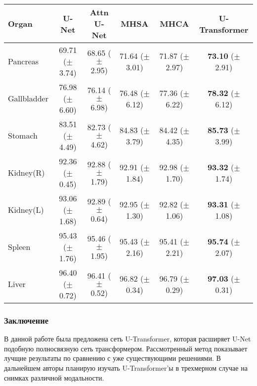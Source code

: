 {\small 
\begin{center}
    \begin{tabular}{l|cc|ccc}
        \toprule[1pt]
        Organ & U-Net& Attn U-Net & MHSA & MHCA & U-Transformer \\
        \hline
        Pancreas & 69.71 \footnotesize{($\pm$ 3.74)} & 68.65 \footnotesize{($\pm$ 2.95)} & 71.64 \footnotesize{($\pm$ 3.01)} & 71.87 \footnotesize{($\pm$ 2.97)} & \textbf{73.10} \footnotesize{($\pm$ 2.91)} \\
        Gallbladder & 76.98 \footnotesize{($\pm$ 6.60)} & 76.14 \footnotesize{($\pm$ 6.98)} & 76.48 \footnotesize{($\pm$ 6.12)} & 77.36 \footnotesize{($\pm$ 6.22)} & \textbf{78.32} \footnotesize{($\pm$ 6.12)} \\
        Stomach & 83.51 \footnotesize{($\pm$ 4.49)} & 82.73 \footnotesize{($\pm$ 4.62)} & 84.83 \footnotesize{($\pm$ 3.79)} & 84.42 \footnotesize{($\pm$ 4.35)} & \textbf{85.73} \footnotesize{($\pm$ 3.99)} \\
        Kidney(R) & 92.36 \footnotesize{($\pm$ 0.45)} & 92.88 \footnotesize{($\pm$ 1.79)} & 92.91 \footnotesize{($\pm$ 1.84)} & 92.98 \footnotesize{($\pm$ 1.70)} & \textbf{93.32} \footnotesize{($\pm$ 1.74)} \\
        Kidney(L) & 93.06 \footnotesize{($\pm$ 1.68)} & 92.89 \footnotesize{($\pm$ 0.64)} & 92.95 \footnotesize{($\pm$ 1.30)} & 92.82 \footnotesize{($\pm$ 1.06)} & \textbf{93.31} \footnotesize{($\pm$ 1.08)} \\
        Spleen & 95.43 \footnotesize{($\pm$ 1.76)} & 95.46 \footnotesize{($\pm$ 1.95)} & 95.43 \footnotesize{($\pm$ 2.16)} & 95.41 \footnotesize{($\pm$ 2.21)} & \textbf{95.74} \footnotesize{($\pm$ 2.07)} \\
        Liver & 96.40 \footnotesize{($\pm$ 0.72)} & 96.41 \footnotesize{($\pm$ 0.52)} & 96.82 \footnotesize{($\pm$ 0.34)} & 96.79 \footnotesize{($\pm$ 0.29)} & \textbf{97.03} \footnotesize{($\pm$ 0.31)} \\
        \toprule[1pt]
    \end{tabular}
\end{center}


}

\subsubsection*{Заключение}
В данной работе была предложена сеть U-Transformer, которая расширяет U-Net подобную 
полносвязную сеть трансформером. Рассмотренный метод показывает лучщие результаты 
по сравнению с уже существующими решениями. В дальнейшем авторы планирую изучать 
U-Transformer'ы в трехмерном случае на снимках различной модальности.